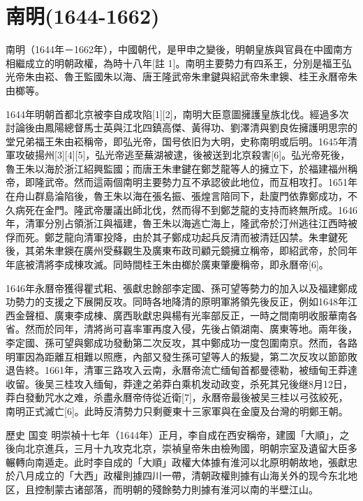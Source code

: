 
\section{南明\tiny(1644-1662)}

南明（1644年－1662年），中國朝代，是甲申之變後，明朝皇族與官員在中國南方相繼成立的明朝政權，為時十八年[註 1]。南明主要勢力有四系王，分別是福王弘光帝朱由崧、魯王監國朱以海、唐王隆武帝朱聿鍵與紹武帝朱聿鐭、桂王永曆帝朱由榔等。

1644年明朝首都北京被李自成攻陷[1][2]，南明大臣意圖擁護皇族北伐。經過多次討論後由鳳陽總督馬士英與江北四鎮高傑、黃得功、劉澤清與劉良佐擁護明思宗的堂兄弟福王朱由崧稱帝，即弘光帝，国号依旧为大明，史称南明或后明。1645年清軍攻破揚州[3][4][5]，弘光帝逃至蕪湖被逮，後被送到北京殺害[6]。弘光帝死後，魯王朱以海於浙江紹興監國；而唐王朱聿鍵在鄭芝龍等人的擁立下，於福建福州稱帝，即隆武帝。然而這兩個南明主要勢力互不承認彼此地位，而互相攻打。1651年在舟山群島淪陷後，魯王朱以海在張名振、張煌言陪同下，赴廈門依靠鄭成功，不久病死在金門。隆武帝屢議出師北伐，然而得不到鄭芝龍的支持而終無所成。1646年，清軍分別占領浙江與福建，魯王朱以海逃亡海上，隆武帝於汀州逃往江西時被俘而死。鄭芝龍向清軍投降，由於其子鄭成功起兵反清而被清廷囚禁。朱聿鍵死後，其弟朱聿鐭在廣州受蘇觀生及廣東布政司顧元鏡擁立稱帝，即紹武帝，於同年年底被清將李成棟攻滅。同時間桂王朱由榔於廣東肇慶稱帝，即永曆帝[6]。

1646年永曆帝獲得瞿式耜、張獻忠餘部李定國、孫可望等勢力的加入以及福建鄭成功勢力的支援之下展開反攻。同時各地降清的原明軍將領先後反正，例如1648年江西金聲桓、廣東李成棟、廣西耿獻忠與楊有光率部反正，一時之間南明收服華南各省。然而於同年，清將尚可喜率軍再度入侵，先後占領湖南、廣東等地。兩年後，李定國、孫可望與鄭成功發動第二次反攻，其中鄭成功一度包圍南京。然而，各路明軍因為距離互相難以照應，內部又發生孫可望等人的叛變，第二次反攻以節節敗退告終。1661年，清軍三路攻入云南，永曆帝流亡缅甸首都曼德勒，被缅甸王莽達收留。後吴三桂攻入缅甸，莽達之弟莽白乘机发动政变，杀死其兄後继8月12日，莽白發動咒水之难，杀盡永曆帝侍從近衛[7]，永曆帝最後被吴三桂以弓弦絞死，南明正式滅亡[6]。此時反清勢力只剩夔東十三家軍與在金廈及台灣的明鄭王朝。

歷史
国变
明崇禎十七年（1644年）正月，李自成在西安稱帝，建國「大順」，之後向北京進兵，三月十九攻克北京，崇禎皇帝朱由檢殉國，明朝宗室及遺留大臣多輾轉向南遁走。此时李自成的「大順」政權大体據有淮河以北原明朝故地，張獻忠於八月成立的「大西」政權則據四川一帶，清朝政權則據有山海关外的现今东北地区，且控制蒙古诸部落，而明朝的殘餘勢力則據有淮河以南的半壁江山。

